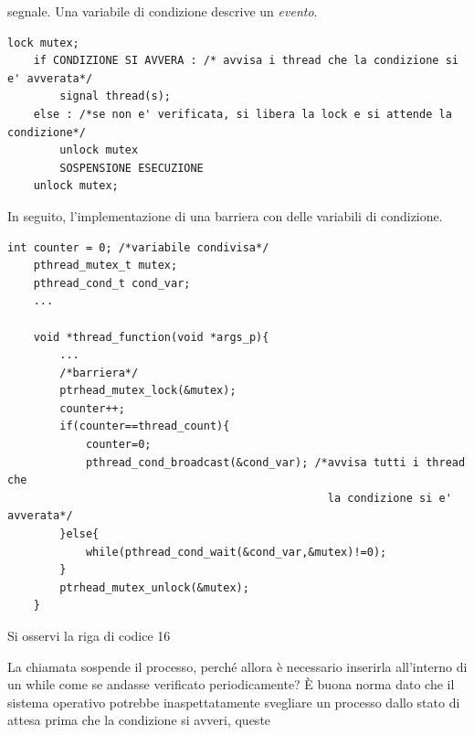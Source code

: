 \documentclass[10pt, letterpaper]{report}
\begin{document}
segnale. Una variabile di condizione descrive un \textit{evento}.
\begin{center}
    \begin{lstlisting}[style=CStyle]
    lock mutex;
    if CONDIZIONE SI AVVERA : /* avvisa i thread che la condizione si e' avverata*/
        signal thread(s); 
    else : /*se non e' verificata, si libera la lock e si attende la condizione*/
        unlock mutex
        SOSPENSIONE ESECUZIONE 
    unlock mutex;
    \end{lstlisting}
\end{center}
In seguito, l'implementazione di una barriera con delle variabili di condizione.
\begin{lstlisting}[style=CStyle]
    int counter = 0; /*variabile condivisa*/
    pthread_mutex_t mutex;
    pthread_cond_t cond_var;
    ... 

    void *thread_function(void *args_p){
        ... 
        /*barriera*/
        ptrhead_mutex_lock(&mutex);
        counter++;
        if(counter==thread_count){
            counter=0;
            pthread_cond_broadcast(&cond_var); /*avvisa tutti i thread che 
                                                 la condizione si e' avverata*/
        }else{
            while(pthread_cond_wait(&cond_var,&mutex)!=0); 
        }
        ptrhead_mutex_unlock(&mutex);
    }
\end{lstlisting}
Si osservi la riga di codice 16\begin{quote}
\end{quote}
La chiamata  sospende il processo, perché allora è necessario inserirla 
all'interno di un while come se andasse verificato periodicamente? È buona norma dato che il sistema operativo 
potrebbe inaspettatamente svegliare un processo dallo stato di attesa prima che la condizione si avveri, queste 
\end{document}
